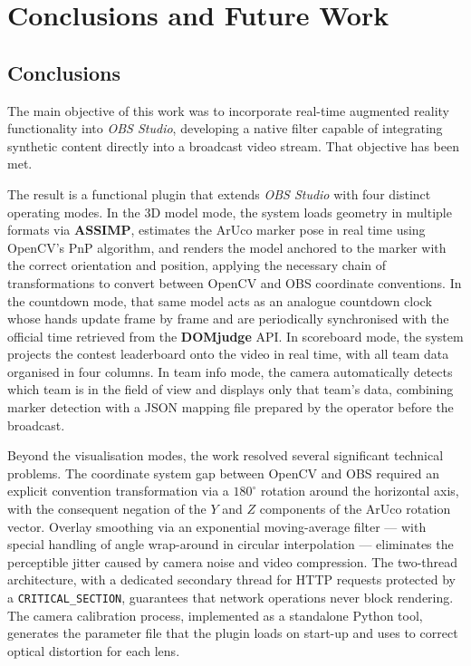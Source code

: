 \chapter{Conclusions and Future Work}
\label{cap:conclusions}


\section{Conclusions}

The main objective of this work was to incorporate real-time augmented reality functionality into \textit{OBS Studio}, developing a native filter capable of integrating synthetic content directly into a broadcast video stream. That objective has been met.

The result is a functional plugin that extends \textit{OBS Studio} with four distinct operating modes. In the 3D model mode, the system loads geometry in multiple formats via \textbf{ASSIMP}, estimates the ArUco marker pose in real time using OpenCV's PnP algorithm, and renders the model anchored to the marker with the correct orientation and position, applying the necessary chain of transformations to convert between OpenCV and OBS coordinate conventions. In the countdown mode, that same model acts as an analogue countdown clock whose hands update frame by frame and are periodically synchronised with the official time retrieved from the \textbf{DOMjudge} \citep{DOMjudge} API. In scoreboard mode, the system projects the contest leaderboard onto the video in real time, with all team data organised in four columns. In team info mode, the camera automatically detects which team is in the field of view and displays only that team's data, combining marker detection with a JSON mapping file prepared by the operator before the broadcast.

Beyond the visualisation modes, the work resolved several significant technical problems. The coordinate system gap between OpenCV and OBS required an explicit convention transformation via a $180^\circ$ rotation around the horizontal axis, with the consequent negation of the $Y$ and $Z$ components of the ArUco rotation vector. Overlay smoothing via an exponential moving-average filter — with special handling of angle wrap-around in circular interpolation — eliminates the perceptible jitter caused by camera noise and video compression. The two-thread architecture, with a dedicated secondary thread for HTTP requests protected by a \texttt{CRITICAL\_SECTION}, guarantees that network operations never block rendering. The camera calibration process, implemented as a standalone Python tool, generates the parameter file that the plugin loads on start-up and uses to correct optical distortion for each lens.

